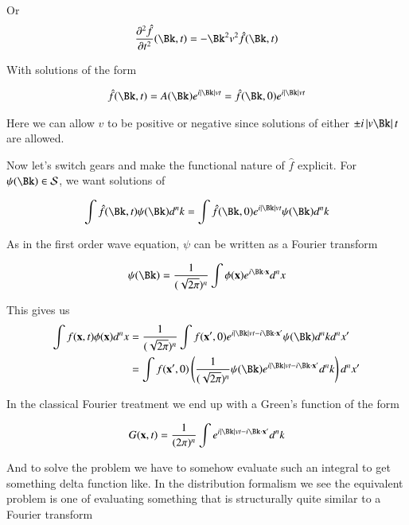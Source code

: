 \documentclass{article}
\newcommand{\PDSq}[2]{\frac{\partial^2 {#2}}{\partial {#1}^2}}
\newcommand{\Sw}[0]{\mathcal{S}}
\begin{document}
Or
\begin{align*}
\PDSq{t}{\hat{f}}(\Bk,t) = - \Bk^2 v^2 \hat{f}(\Bk,t) 
\end{align*}

With solutions of the form

\begin{align*}
\hat{f}(\Bk,t) = A(\Bk) e^{i \Abs{\Bk} v t} = \hat{f}(\Bk,0) e^{i \Abs{\Bk} v t}
\end{align*}

Here we can allow $v$ to be positive or negative since solutions of either $\pm i \Abs{v \Bk} t$ are allowed.

Now let's switch gears and make the functional nature of $\hat{f}$ explicit.  For $\psi(\Bk) \in \Sw$, we want solutions
of

\begin{align*}
\int \hat{f}(\Bk,t) \psi(\Bk) d^n k = \int \hat{f}(\Bk,0) e^{i \Abs{\Bk} v t} \psi(\Bk) d^n k 
\end{align*}

As in the first order wave equation, $\psi$ can be written as a Fourier transform 

\begin{align}\label{eqn:fourierWaveTx}
\psi(\Bk) = \frac{1}{(\sqrt{2\pi})^n} \int \phi(\Bx) e^{i \Bk \cdot \Bx } d^n x 
\end{align}

This gives us
\begin{align*}
\int {f}(\Bx,t) \phi(\Bx) d^n x 
&= \frac{1}{(\sqrt{2\pi})^n} \int {f}(\Bx',0) e^{i \Abs{\Bk} v t - i \Bk \cdot \Bx' } \psi(\Bk) d^n k d^n x' \\
&= 
\int {f}(\Bx',0) \left( \frac{1}{(\sqrt{2\pi})^n} \psi(\Bk) e^{i \Abs{\Bk} v t - i \Bk \cdot \Bx' } d^n k 
\right) d^n x' \\
\end{align*}

In the classical Fourier treatment we end up with a Green's function of the form

\begin{align*}
G(\Bx, t) = \frac{1}{({2\pi})^n} \int e^{i \Abs{\Bk} v t - i \Bk \cdot \Bx' } d^n k 
\end{align*}

And to solve the problem we have to somehow evaluate such an integral to get something delta function like.  In the distribution
formalism we see the equivalent problem is one of evaluating something that is structurally quite similar to
a Fourier transform
\end{document}
